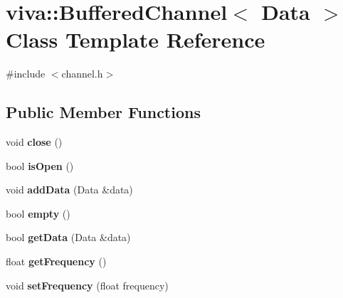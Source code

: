 \hypertarget{classviva_1_1_buffered_channel}{}\section{viva\+:\+:Buffered\+Channel$<$ Data $>$ Class Template Reference}
\label{classviva_1_1_buffered_channel}


{\ttfamily \#include $<$channel.\+h$>$}

\subsection*{Public Member Functions}
\begin{DoxyCompactItemize}
\item 
void {\bfseries close} ()\hypertarget{classviva_1_1_buffered_channel_acb24517afd825ce0d427d4168e43066a}{}\label{classviva_1_1_buffered_channel_acb24517afd825ce0d427d4168e43066a}

\item 
bool {\bfseries is\+Open} ()\hypertarget{classviva_1_1_buffered_channel_a050135d852648e0e7f546e906b003c44}{}\label{classviva_1_1_buffered_channel_a050135d852648e0e7f546e906b003c44}

\item 
void {\bfseries add\+Data} (Data \&data)\hypertarget{classviva_1_1_buffered_channel_a8a5a9c2ffa1e47bb659766c409f36a5b}{}\label{classviva_1_1_buffered_channel_a8a5a9c2ffa1e47bb659766c409f36a5b}

\item 
bool {\bfseries empty} ()\hypertarget{classviva_1_1_buffered_channel_a1a2d3b79535fee31c7b70e33fb05334d}{}\label{classviva_1_1_buffered_channel_a1a2d3b79535fee31c7b70e33fb05334d}

\item 
bool {\bfseries get\+Data} (Data \&data)\hypertarget{classviva_1_1_buffered_channel_adbb3863b802221ea53d6d1c73d72a77e}{}\label{classviva_1_1_buffered_channel_adbb3863b802221ea53d6d1c73d72a77e}

\item 
float {\bfseries get\+Frequency} ()\hypertarget{classviva_1_1_buffered_channel_a4ebfedca499bde922ffc49e44c2f1772}{}\label{classviva_1_1_buffered_channel_a4ebfedca499bde922ffc49e44c2f1772}

\item 
void {\bfseries set\+Frequency} (float frequency)\hypertarget{classviva_1_1_buffered_channel_a04147502039bb50c82bdae5cae1c80b9}{}\label{classviva_1_1_buffered_channel_a04147502039bb50c82bdae5cae1c80b9}


\end{DoxyCompactItemize}
